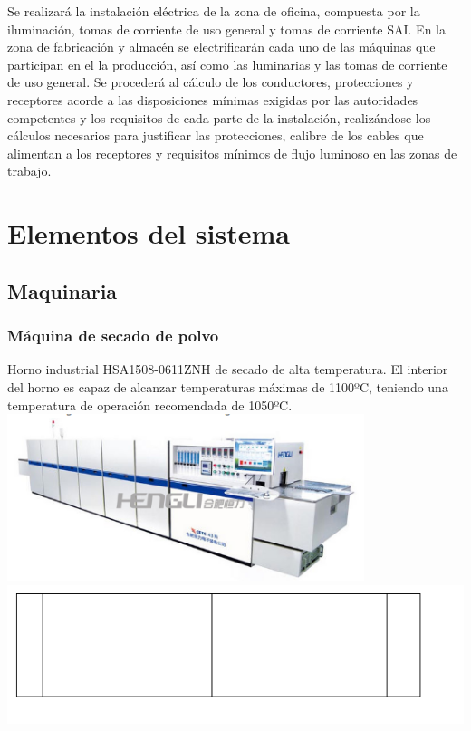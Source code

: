 Se realizará la instalación eléctrica de la zona de oficina, compuesta por la iluminación, tomas de corriente de uso general y tomas de corriente SAI. En la zona de fabricación y almacén se electrificarán cada uno de las máquinas que participan en el la producción, así como las luminarias y las tomas de corriente de uso general. Se procederá al cálculo de los conductores, protecciones y receptores acorde a las disposiciones mínimas exigidas por las autoridades competentes y los requisitos de cada parte de la instalación, realizándose los cálculos necesarios para justificar las protecciones, calibre de los cables que alimentan a los receptores y requisitos mínimos de flujo luminoso en las zonas de trabajo.

\pagebreak

\section{Elementos del sistema}
\subsection{Maquinaria}
	\subsubsection{Máquina de secado de polvo}

	

	Horno industrial HSA1508-0611ZNH de secado de alta temperatura. El interior del horno es capaz de alcanzar temperaturas máximas de 1100ºC, teniendo una temperatura de operación recomendada de 1050ºC.\\

	\includegraphics[scale=0.5]{Datasheets/1HornoFoto.png} 
	\includegraphics[scale=0.5]{Datasheets/Miniaturas/horno.png}\\

